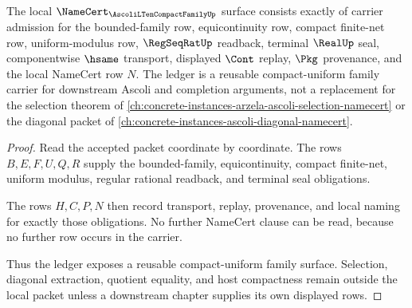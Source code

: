 \begin{theorem}\label{thm:ascoli-l10-namecert-ledger}
The local $\NameCert_{\AscoliLTenCompactFamilyUp}$ surface consists exactly of carrier admission for the bounded-family row, equicontinuity row, compact finite-net row, uniform-modulus row, $\RegSeqRatUp$ readback, terminal $\RealUp$ seal, componentwise $\hsame$ transport, displayed $\Cont$ replay, $\Pkg$ provenance, and the local NameCert row $N$. The ledger is a reusable compact-uniform family carrier for downstream Ascoli and completion arguments, not a replacement for the selection theorem of \autoref{ch:concrete-instances-arzela-ascoli-selection-namecert} or the diagonal packet of \autoref{ch:concrete-instances-ascoli-diagonal-namecert}.
\end{theorem}
\begin{proof}
Read the accepted packet coordinate by coordinate. The rows $B,E,F,U,Q,R$ supply the bounded-family, equicontinuity, compact finite-net, uniform modulus, regular rational readback, and terminal seal obligations.

The rows $H,C,P,N$ then record transport, replay, provenance, and local naming for exactly those obligations. No further NameCert clause can be read, because no further row occurs in the carrier.

Thus the ledger exposes a reusable compact-uniform family surface. Selection, diagonal extraction, quotient equality, and host compactness remain outside the local packet unless a downstream chapter supplies its own displayed rows.
\end{proof}


\begin{closurestatus}{\AscoliLTenCompactFamilyUp}
  \theoryclosure{\seedClosure}
  \formalstatus{\unformalizedV}
\end{closurestatus}
